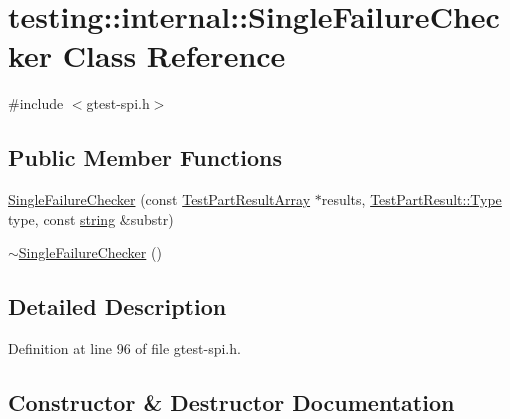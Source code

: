 \hypertarget{classtesting_1_1internal_1_1_single_failure_checker}{}\section{testing\+:\+:internal\+:\+:Single\+Failure\+Checker Class Reference}
\label{classtesting_1_1internal_1_1_single_failure_checker}


{\ttfamily \#include $<$gtest-\/spi.\+h$>$}

\subsection*{Public Member Functions}
\begin{DoxyCompactItemize}
\item 
\hyperlink{classtesting_1_1internal_1_1_single_failure_checker_a6d350d385526c97c9982e928f5f8fb56}{Single\+Failure\+Checker} (const \hyperlink{classtesting_1_1_test_part_result_array}{Test\+Part\+Result\+Array} $\ast$results, \hyperlink{classtesting_1_1_test_part_result_a65ae656b33fdfdfffaf34858778a52d5}{Test\+Part\+Result\+::\+Type} type, const \hyperlink{namespacetesting_1_1internal_a8e8ff5b11e64078831112677156cb111}{string} \&substr)
\item 
\hyperlink{classtesting_1_1internal_1_1_single_failure_checker_a4b0a907c9c1b350c79d70af138e9f0bf}{$\sim$\+Single\+Failure\+Checker} ()
\end{DoxyCompactItemize}


\subsection{Detailed Description}


Definition at line 96 of file gtest-\/spi.\+h.



\subsection{Constructor \& Destructor Documentation}
